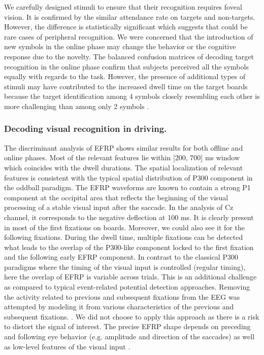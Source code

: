 \documentclass[12pt]{iopart}
\begin{document}
We carefully designed stimuli
to ensure that their recognition requires foveal vision.
It is confirmed by the similar
attendance rate on targets and non-targets.
However, the difference is statistically significant 
which suggests that could be rare cases of peripheral recognition.
We were concerned that the introduction of new symbols in the online phase
may change the behavior or the cognitive response due to the novelty.
The balanced confusion matrices of decoding target recognition in the online phase
confirm that subjects perceived all the symbols equally with regards
to the task. However, the presence of additional types of stimuli 
may have contributed to the increased dwell time 
on the target boards because the target identification 
among 4 symbols closely resembling each other 
is more challenging than among only 2 symbols
\cite{dick_processing_1971,alegria_time_1970}.


\subsubsection*{Decoding visual recognition in driving.}
The discriminant analysis of EFRP shows similar results for both
offline and online phases. Most of the relevant
features lie within [200, 700] ms window which coincides with the dwell
durations. The spatial localization of relevant features is consistent with the typical
spatial distribution of P300 component in the oddball paradigm.
The EFRP waveforms are known to contain a strong P1 component at the occipital
area that reflects the beginning of the visual processing of a stable visual input
after the saccade. In the analysis of Cz channel, it corresponds to the negative
deflection at 100 ms. It is clearly present in most of the first fixations on boards.
Moreover, we could also see it for the following fixations.
During the dwell time, multiple fixations can be detected 
what leads to the overlap of the P300-like component
locked to the first fixation and the following early EFRP component.
In contrast to the classical P300 paradigms where the timing
of the visual input is controlled (regular timing), here the
overlap of EFRP is variable across trials.
This is an additional challenge as compared to typical
event-related potential detection approaches.
Removing the activity related to previous and subsequent fixations
from the EEG was attempted by modeling it from
various characteristics of the previous and subsequent fixations.
\cite{devillez_p300_2015,devillez_eye_2015,kristensen_comparison_2015}.
We did not choose to apply this approach as there is a risk 
to distort the signal of interest.
The precise EFRP shape depends on preceding and following
eye behavior (e.g. amplitude and direction of the saccades)
as well as low-level features of the visual input
\cite{nikolaev_combining_2016}.
\end{document}
